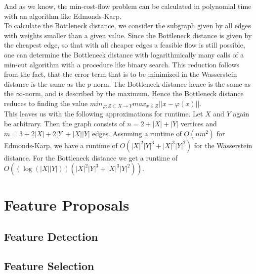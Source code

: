 \documentclass[11pt, a4paper,draft]{report}
\begin{document}
 	And as we know, the min-cost-flow problem can be calculated in polynomial time with an algorithm like Edmonds-Karp.\\
To calculate the Bottleneck distance, we consider the subgraph given by all edges with weights smaller than a given value. Since the Bottleneck distance is given by the cheapest edge, so that with all cheaper edges a feasible flow is still possible, one can determine the Bottleneck distance with logarithmically many calls of a min-cut algorithm with a procedure like binary search. This reduction follows from the fact, that the error term that is to be minimized in the Wasserstein distance is the same as the $p$-norm. The Bottleneck distance hence is the same as the $\infty$-norm, and is described by the maximum. Hence the Bottleneck distance reduces to finding the value $min_{\varphi:Z\subset X \rightarrow Y} max_{x\in Z}||x - \varphi(x)||$.\\
	This leaves us with the following approximations for runtime. Let $X$ and $Y$ again be arbitrary. Then the graph consists of $n=2+|X|+|Y|$ vertices and $m=3+2|X|+2|Y|+|X||Y|$ edges. Assuming a runtime of $O(nm^2)$ for Edmonds-Karp, we have a runtime of $O(|X|^2|Y|^3 + |X|^3|Y|^2)$ for the Wasserstein distance. For the Bottleneck distance we get a runtime of $O((\log(|X||Y|))(|X|^2|Y|^3 + |X|^3|Y|^2))$.
	
\chapter{Feature Proposals}
\section{Feature Detection}
\section{Feature Selection}
\end{document}
